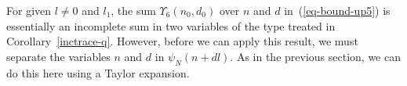 \documentclass[12pt,a4paper,reqno]{amsart}
\numberwithin{equation}{section}
\theoremstyle{plain}
\theoremstyle{definition}
\newcommand\eps{\varepsilon}
\def\stacksum#1#2{{\stackrel{{\scriptstyle #1}}
{{\scriptstyle #2}}}}
\newcommand\sumsum{\mathop{\sum\sum}\limits}
\renewcommand{\lessapprox}{\llcurly}
\begin{document}




For given $l\neq 0$ and $l_1$, the sum $\Upsilon_6(n_0,d_0)$ over $n$
and $d$ in~(\ref{eq-bound-up5}) is essentially an incomplete sum in
two variables of the type treated in
Corollary~\ref{inctrace-q}. However, before we can apply this result,
we must separate the variables $n$ and $d$ in $\psi_{N}(n+dl)$. As in
the previous section, we can do this here using a Taylor expansion.
\end{document}
